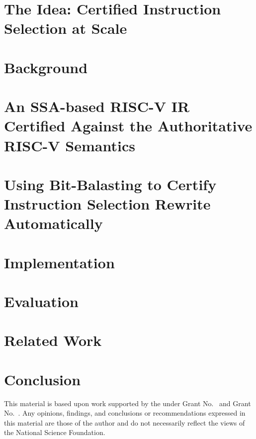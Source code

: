 \documentclass[review, anonymous, acmsmall, screen]{acmart}
\begin{document}
\section{The Idea: Certified Instruction Selection at Scale}


\section{Background}
\label{sec:background}


\section{An SSA-based RISC-V IR Certified Against the Authoritative RISC-V Semantics}
\label{sec:riscv-ssa}

\section{Using Bit-Balasting to Certify Instruction Selection Rewrite Automatically}
\label{sec:inst-selection-automation}

\section{Implementation}
\label{sec:implementation}

\section{Evaluation}
\label{sec:evaluation}

\section{Related Work}

\section{Conclusion}

\begin{acks}                            %
  This material is based upon work supported by the
   under Grant
  No.~ and Grant
  No.~.  Any opinions, findings, and
  conclusions or recommendations expressed in this material are those
  of the author and do not necessarily reflect the views of the
  National Science Foundation.
\end{acks}
\end{document}
